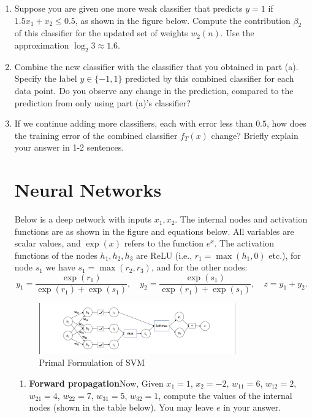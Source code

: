 \documentclass[a3paper,12pt]{extarticle} %
\begin{document}
\begin{enumerate}
\item Suppose you are given one more weak classifier that predicts $y = 1$ if $1.5x_1 + x_2 \leq 0.5$, as shown in the figure below. Compute the contribution $\beta_2$ of this classifier for the updated set of weights $w_2(n)$. Use the approximation $\log_2 3 \approx 1.6$.

\item Combine the new classifier with the classifier that you obtained in part (a). Specify the label $y \in \{-1, 1\}$ predicted by this combined classifier for each data point. Do you observe any change in the prediction, compared to the prediction from only using part (a)'s classifier?

\item  If we continue adding more classifiers, each with error less than $0.5$, how does the training error of the combined classifier $f_T(x)$ change? Briefly explain your answer in 1-2 sentences.

\newpage
\section{Neural Networks}
Below is a deep network with inputs $x_1, x_2$. The internal nodes and activation functions are as shown in the figure and equations below. All variables are scalar values, and $\exp(x)$ refers to the function $e^x$. The activation functions of the nodes $h_1, h_2, h_3$ are ReLU (i.e., $r_1 = \max(h_1, 0)$ etc.), for node $s_1$ we have $s_1 = \max(r_2, r_3)$, and for the other nodes:
\[
y_1 = \frac{\exp(r_1)}{\exp(r_1) + \exp(s_1)}, \quad y_2 = \frac{\exp(s_1)}{\exp(r_1) + \exp(s_1)}, \quad z = y_1 + y_2.
\]
\begin{figure}[h]
    \centering
    \includegraphics[width=0.8\textwidth]{Neural.png}
    \caption{Primal Formulation of SVM}
    \label{fig:primal}
\end{figure}
\begin{enumerate}
    \item \textbf{Forward propagation}Now,  Given $x_1 = 1$, $x_2 = -2$, $w_{11} = 6$, $w_{12} = 2$, $w_{21} = 4$, $w_{22} = 7$, $w_{31} = 5$, $w_{32} = 1$, compute the values of the internal nodes (shown in the table below). You may leave $e$ in your answer.


\end{enumerate}
\end{enumerate}
\end{document}

